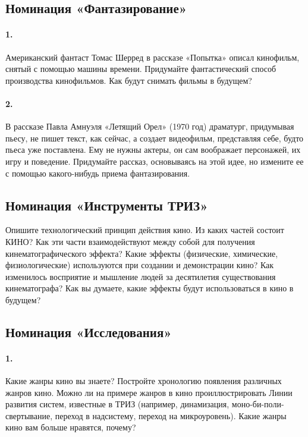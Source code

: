 \documentclass[11pt,a4paper]{article}
\begin{document}
\subsection*{Номинация «Фантазирование»}

\paragraph{1.}
Американский фантаст Томас Шерред в рассказе «Попытка» описал кинофильм,
снятый с помощью машины времени. Придумайте фантастический способ производства
кинофильмов. Как будут снимать фильмы в будущем?

\paragraph{2.}
В рассказе Павла Амнуэля «Летящий Орел» (1970 год) драматург, придумывая
пьесу, не пишет текст, как сейчас, а создает видеофильм, представляя себе,
будто пьеса уже поставлена. Ему не нужны актеры, он сам воображает персонажей,
их игру и поведение. Придумайте рассказ, основываясь на этой идее, но измените
ее с помощью какого-нибудь приема фантазирования.

\subsection*{Номинация «Инструменты ТРИЗ»}

Опишите технологический принцип действия кино. Из каких частей состоит КИНО?
Как эти части взаимодействуют между собой для получения кинематографического
эффекта? Какие эффекты (физические, химические, физиологические) используются
при создании и демонстрации кино? Как изменилось восприятие и мышление людей
за десятилетия существования кинематографа? Как вы думаете, какие эффекты
будут использоваться в кино в будущем?

\subsection*{Номинация «Исследования»}

\paragraph{1.}
Какие жанры кино вы знаете? Постройте хронологию появления различных жанров
кино. Можно ли на примере жанров в кино проиллюстрировать Линии развития
систем, известные в ТРИЗ (например, динамизация, моно-би-поли-свертывание,
переход в надсистему, переход на микроуровень). Какие жанры кино вам больше
нравятся, почему?
\end{document}
